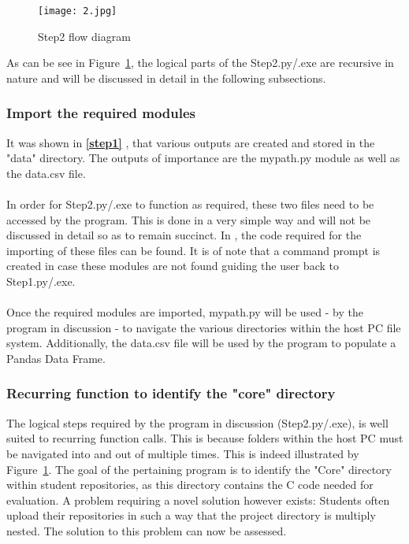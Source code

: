 \begin{figure}[H]
\begin{center}
\texttt{[image: 2.jpg]}
\caption{Step2 flow diagram}
\label{2}
\end{center}
\end{figure}

As can be see in Figure~\ref{2}, the logical parts of the Step2.py/.exe are recursive in nature and will be discussed in detail in the following subsections.

\subsubsection{Import the required modules}
\label{impMod}
It was shown in \textbf{\ref{step1} }, that various outputs are created and stored in the "data" directory. The outputs of importance are the mypath.py module as well as the data.csv file.
\\\\
In order for Step2.py/.exe to function as required, these two files need to be accessed by the program. This is done in a very simple way and will not be discussed in detail so as to remain succinct. In \textbf{}, the code required for the importing of these files can be found. It is of note that a command prompt is created in case these modules are not found guiding the user back to Step1.py/.exe.
\\\\
Once the required modules are imported, mypath.py will be used - by the program in discussion - to navigate the various directories within the host PC file system. Additionally, the data.csv file will be used by the program to populate a Pandas Data Frame.

\subsubsection{Recurring function to identify the "core" directory}
\label{recFun}
The logical steps required by the program in discussion (Step2.py/.exe), is well suited to recurring function calls. This is because folders within the host PC must be navigated into and out of multiple times. This is indeed illustrated by Figure~\ref{2}. The goal of the pertaining program is to identify the "Core" directory within student repositories, as this directory contains the C code needed for evaluation. A problem requiring a novel solution however exists: Students often upload their repositories in such a way that the project directory is multiply nested. The solution to this problem can now be assessed. 

